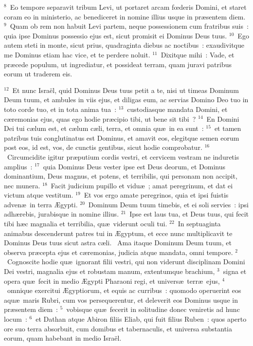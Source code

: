 ${}^{8}$~Eo tempore separavit tribum Levi, ut portaret arcam fœderis Domini, et staret coram eo in ministerio, ac benediceret in nomine illius usque in pr\ae sentem diem.
${}^{9}$~Quam ob rem non habuit Levi partem, neque possessionem cum fratribus suis~: quia ipse Dominus possessio ejus est, sicut promisit ei Dominus Deus tuus.
${}^{10}$~Ego autem steti in monte, sicut prius, quadraginta diebus ac noctibus~: exaudivitque me Dominus etiam hac vice, et te perdere noluit.
${}^{11}$~Dixitque mihi~: Vade, et pr\ae cede populum, ut ingrediatur, et possideat terram, quam juravi patribus eorum ut traderem eis.


${}^{12}$~Et nunc Isra\"el, quid Dominus Deus tuus petit a te, nisi ut timeas Dominum Deum tuum, et ambules in viis ejus, et diligas eum, ac servias Domino Deo tuo in toto corde tuo, et in tota anima tua~:
${}^{13}$~custodiasque mandata Domini, et c\ae remonias ejus, quas ego hodie pr\ae cipio tibi, ut bene sit tibi~?
${}^{14}$~En Domini Dei tui c\ae lum est, et c\ae lum c\ae li, terra, et omnia qu\ae\ in ea sunt~:
${}^{15}$~et tamen patribus tuis conglutinatus est Dominus, et amavit eos, elegitque semen eorum post eos, id est, vos, de cunctis gentibus, sicut hodie comprobatur.
${}^{16}$~Circumcidite igitur pr\ae putium cordis vestri, et cervicem vestram ne induretis amplius~:
${}^{17}$~quia Dominus Deus vester ipse est Deus deorum, et Dominus dominantium, Deus magnus, et potens, et terribilis, qui personam non accipit, nec munera.
${}^{18}$~Facit judicium pupillo et vidu\ae~; amat peregrinum, et dat ei victum atque vestitum.
${}^{19}$~Et vos ergo amate peregrinos, quia et ipsi fuistis adven\ae\ in terra \AE gypti.
${}^{20}$~Dominum Deum tuum timebis, et ei soli servies~: ipsi adh\ae rebis, jurabisque in nomine illius.
${}^{21}$~Ipse est laus tua, et Deus tuus, qui fecit tibi h\ae c magnalia et terribilia, qu\ae\ viderunt oculi tui.
${}^{22}$~In septuaginta animabus descenderunt patres tui in \AE gyptum, et ecce nunc multiplicavit te Dominus Deus tuus sicut astra c\ae li.
~\lettrine[lines=10,image=true,loversize=0.05,lraise=-0.03]{A}{}ma itaque Dominum Deum tuum, et observa pr\ae cepta ejus et c\ae remonias, judicia atque mandata, omni tempore.
${}^{2}$~Cognoscite hodie qu\ae\ ignorant filii vestri, qui non viderunt disciplinam Domini Dei vestri, magnalia ejus et robustam manum, extentumque brachium,
${}^{3}$~signa et opera qu\ae\ fecit in medio \AE gypti Pharaoni regi, et univers\ae\ terr\ae\ ejus,
${}^{4}$~omnique exercitui \AE gyptiorum, et equis ac curribus~: quomodo operuerint eos aqu\ae\ maris Rubri, cum vos persequerentur, et deleverit eos Dominus usque in pr\ae sentem diem~:
${}^{5}$~vobisque qu\ae\ fecerit in solitudine donec veniretis ad hunc locum~:
${}^{6}$~et Dathan atque Abiron filiis Eliab, qui fuit filius Ruben~: quos aperto ore suo terra absorbuit, cum domibus et tabernaculis, et universa substantia eorum, quam habebant in medio Isra\"el.


